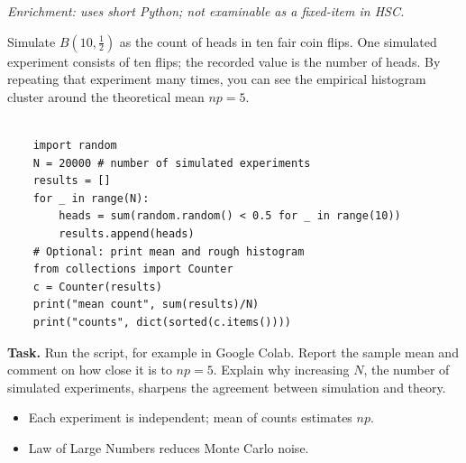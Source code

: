 \begin{problem}
\textit{Enrichment: uses short Python; not examinable as a fixed-item in HSC.}

Simulate $B(10,\tfrac12)$ as the count of heads in ten fair coin flips. One simulated experiment consists of ten flips; the recorded value is the number of heads. By repeating that experiment many times, you can see the empirical histogram cluster around the theoretical mean $np=5$.

\begin{verbatim}

    import random
    N = 20000 # number of simulated experiments
    results = []
    for _ in range(N):
        heads = sum(random.random() < 0.5 for _ in range(10))
        results.append(heads)
    # Optional: print mean and rough histogram
    from collections import Counter
    c = Counter(results)
    print("mean count", sum(results)/N)
    print("counts", dict(sorted(c.items())))

\end{verbatim}



\textbf{Task.} Run the script, for example in Google Colab. Report the sample mean and comment on how close it is to $np=5$. Explain why increasing $N$, the number of simulated experiments, sharpens the agreement between simulation and theory.
\end{problem}

\begin{hint}
\begin{itemize}[leftmargin=*]
\item Each experiment is independent; mean of counts estimates $np$.
\item Law of Large Numbers reduces Monte Carlo noise.
\end{itemize}
\end{hint}

